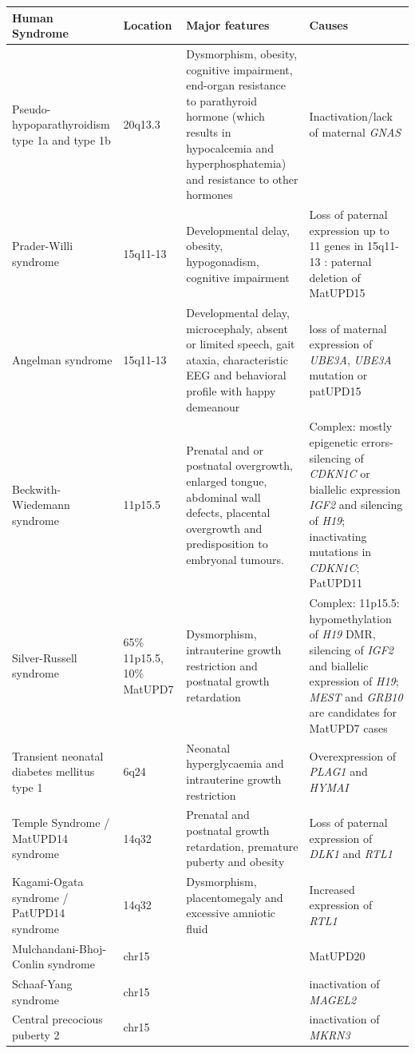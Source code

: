 \begin{table}
\centering
\begin{adjustbox}{width=1\textwidth}
\begin{tabular}{@{}p{3cm}p{2cm}p{7cm}p{7cm}@{}}
\toprule Human Syndrome & Location & Major features & Causes \\ \midrule 
Pseudo-hypoparathyroidism type 1a and type 1b\cite{Mantovani:2016em,Elli:2016et}  & 20q13.3 & Dysmorphism, obesity, cognitive impairment, end-organ resistance to parathyroid hormone (which results in hypocalcemia and hyperphosphatemia) and resistance to other hormones & Inactivation/lack of maternal \emph{GNAS} \\ 
Prader-Willi syndrome\cite{Buiting:2010ci} & 15q11-13 & Developmental delay, obesity, hypogonadism, cognitive impairment & Loss of paternal expression up to 11 genes in 15q11-13 : paternal deletion of MatUPD15\\  
Angelman syndrome\cite{Buiting:2010ci}  & 15q11-13 & Developmental delay, microcephaly, absent or limited speech, gait ataxia, characteristic EEG and behavioral profile with happy demeanour & loss of maternal expression of \emph{UBE3A}, \emph{UBE3A} mutation or patUPD15\\
Beckwith-Wiedemann syndrome\cite{Choufani:2010ca} & 11p15.5 & Prenatal and or postnatal overgrowth, enlarged tongue, abdominal wall defects, placental overgrowth and predisposition to embryonal tumours. & Complex: mostly epigenetic errors- silencing of \emph{CDKN1C} or biallelic expression \emph{IGF2} and silencing of \emph{H19}; inactivating mutations in \emph{CDKN1C}; PatUPD11\\
Silver-Russell syndrome\cite{Eggermann:2010gl,Wakeling:2017kv} & 65\% 11p15.5, 10\% MatUPD7 & Dysmorphism, intrauterine growth restriction and postnatal growth retardation & Complex: 11p15.5: hypomethylation of \emph{H19} DMR, silencing of \emph{IGF2} and biallelic expression of \emph{H19}; \emph{MEST} and \emph{GRB10} are candidates for MatUPD7 cases\\
Transient neonatal diabetes mellitus type 1\cite{Mackay:2006bv} & 6q24& Neonatal hyperglycaemia and intrauterine growth restriction & Overexpression of \emph{PLAG1} and \emph{HYMAI}\\
Temple Syndrome\cite{Ioannides:2014ka,Kagami:2017gp} / MatUPD14 syndrome & 14q32 & Prenatal and postnatal growth retardation, premature puberty and obesity & Loss of paternal expression of \emph{DLK1} and \emph{RTL1} \\
Kagami-Ogata syndrome\cite{Kagami:2015gn,Kagami:2017gp,Ogata:2016jb} / PatUPD14 syndrome & 14q32 & Dysmorphism, placentomegaly and excessive amniotic fluid & Increased expression of \emph{RTL1}\\
Mulchandani-Bhoj-Conlin syndrome\cite{Mulchandani:2016kf} & chr15 & & MatUPD20\\
Schaaf-Yang syndrome\cite{Fountain:2017dd} & chr15  & & inactivation of \emph{MAGEL2}\\
Central precocious puberty 2\cite{Abreu:2013je} & chr15 & & inactivation of \emph{MKRN3}\\


\end{tabular}
\end{adjustbox}
\end{table}
